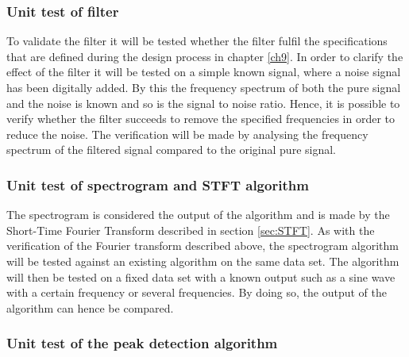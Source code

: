 \subsubsection{Unit test of filter}
To validate the filter it will be tested whether the filter fulfil the specifications that are defined during the design process in chapter \ref{ch9}. In order to clarify the effect of the filter it will be tested on a simple known signal, where a noise signal has been digitally added. By this the frequency spectrum of both the pure signal and the noise is known and so is the signal to noise ratio. Hence, it is possible to verify whether the filter succeeds to remove the specified frequencies in order to reduce the noise. The verification will be made by analysing the frequency spectrum of the filtered signal compared to the original pure signal. 

\subsubsection{Unit test of spectrogram and STFT algorithm}
The spectrogram is considered the output of the algorithm and is made by the Short-Time Fourier Transform described in section \ref{sec:STFT}. As with the verification of the Fourier transform described above, the spectrogram algorithm will be tested against an existing algorithm on the same data set.
The algorithm will then be tested on a fixed data set with a known output such as a sine wave with a certain frequency or several frequencies. By doing so, the output of the algorithm can hence be compared.

\subsubsection{Unit test of the peak detection algorithm}


